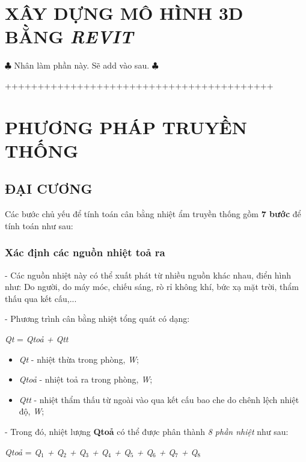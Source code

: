 
\section{XÂY DỰNG MÔ HÌNH 3D BẰNG \emph{REVIT}}
$ \clubsuit $ Nhân làm phần này. Sẽ add vào sau. $ \clubsuit $

+++++++++++++++++++++++++++++++++++++++++

\section{PHƯƠNG PHÁP TRUYỀN THỐNG}
\subsection{ĐẠI CƯƠNG}
Các bước chủ yếu để tính toán cân bằng nhiệt ẩm truyền thống gồm \textbf{7 bước} để tính toán như sau:
\subsubsection{Xác định các nguồn nhiệt toả ra}
- Các nguồn nhiệt này có thể xuất phát từ nhiều nguồn khác nhau, điển hình như: Do người, do máy móc, chiếu sáng, rò rỉ không khí, bức xạ mặt trời, thẩm thấu qua kết cấu,...

- Phương trình cân bằng nhiệt tổng quát có dạng:

\begin{center}
	\textit{Q{\footnotesize t}} = \textit{Q{\footnotesize toả} + Q{\footnotesize tt}}
\end{center}

\begin{itemize}[leftmargin = 3cm, label = $\star$]
	\item \textit{Q{\footnotesize t}} - nhiệt thừa trong phòng, \textit{W};
	
	\item \textit{Q{\footnotesize toả}} - nhiệt toả ra trong phòng, \textit{W};
	
	\item \textit{Q{\footnotesize tt}} - nhiệt thẩm thấu từ ngoài vào qua kết cấu bao che do chênh lệch nhiệt độ, \textit{W};
\end{itemize}


- Trong đó, nhiệt lượng \textbf{Q{\footnotesize toả}} có thể được phân thành \textit{8 phần nhiệt} như sau:

\begin{center}
	\textit{Q{\footnotesize toả}} = \textit{Q$ _{1} $ + Q$ _{2} $ + Q$ _{3} $ + Q$ _{4} $ + Q$ _{5} $ + Q$ _{6} $ + Q$ _{7} $ + Q$ _{8} $}
\end{center}

